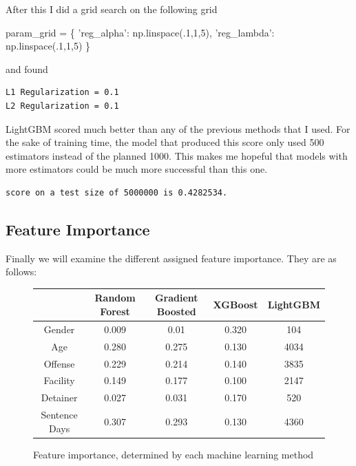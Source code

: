 \documentclass[11pt]{article}
\newenvironment{Shaded}{}{}
\newcommand{\DecValTok}[1]{\textcolor[rgb]{0.25,0.63,0.44}{{#1}}}
\newcommand{\StringTok}[1]{\textcolor[rgb]{0.25,0.44,0.63}{{#1}}}
\newcommand{\NormalTok}[1]{{#1}}
\newcommand{\OperatorTok}[1]{\textcolor[rgb]{0.40,0.40,0.40}{{#1}}}
\begin{document}
After this I did a grid search on the following grid

\begin{Shaded}
\begin{Highlighting}[]
\NormalTok{param_grid }\OperatorTok{=}\NormalTok{ \{}
    \StringTok{'reg_alpha'}\NormalTok{: np.linspace(.}\DecValTok{1}\NormalTok{,}\DecValTok{1}\NormalTok{,}\DecValTok{5}\NormalTok{),}
    \StringTok{'reg_lambda'}\NormalTok{: np.linspace(.}\DecValTok{1}\NormalTok{,}\DecValTok{1}\NormalTok{,}\DecValTok{5}\NormalTok{)}
\NormalTok{\}}
\end{Highlighting}
\end{Shaded}

and found

    \begin{Verbatim}[commandchars=\\\{\}]
L1 Regularization = 0.1
L2 Regularization = 0.1

    \end{Verbatim}

LightGBM scored much better than any of the previous methods that I used. For the sake of training time, the model that produced this score only used 500 estimators instead of the planned 1000. This makes me hopeful that models with more estimators could be much more successful than this one.

    \begin{Verbatim}[commandchars=\\\{\}]
score on a test size of 5000000 is 0.4282534.
    \end{Verbatim}

    \hypertarget{feature-importance}{%
\subsection{Feature Importance}\label{feature-importance}}

Finally we will examine the different assigned feature importance. They are as follows:

\begin{figure}[H]
    \centering
    \caption[Caption for feature import]{Feature importance, determined by each machine learning method\footnotemark }
    \begin{tabular}{c | c  c  c  c}
         & Random Forest & Gradient Boosted & XGBoost & LightGBM \\
        \hline
        Gender & 0.009 & 0.01 & 0.320 & 104 \\
        Age  & 0.280 & 0.275 & 0.130 & 4034 \\
        Offense & 0.229 & 0.214 & 0.140 & 3835 \\
        Facility & 0.149 & 0.177 & 0.100 & 2147 \\
        Detainer & 0.027 & 0.031 & 0.170 & 520 \\
        Sentence Days & 0.307 & 0.293 & 0.130 & 4360
    \end{tabular}
    \label{fig:my_label}
\end{figure}
\end{document}
